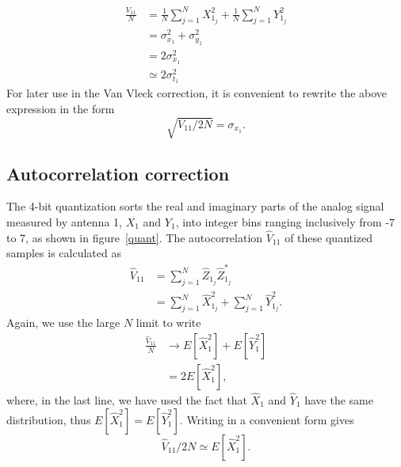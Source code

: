 \documentclass[11pt]{article}
\begin{document}
\begin{align}
\frac{V_{11}}{N}&=\frac{1}{N}\sum_{j=1}^N X_{1_j}^2+\frac{1}{N}\sum_{j=1}^N Y_{1_j}^2\\
&=\sigma_{x_1}^2 + \sigma_{y_1}^2\\
&= 2\sigma_{x_1}^2\\
&\simeq 2\sigma_{t_1}^2
\end{align}
For later use in the Van Vleck correction, it is convenient to rewrite the above expression in the form
\begin{equation}\label{auto}
\sqrt{V_{11}/2N}=\sigma_{x_1}.
\end{equation}

\subsection{Autocorrelation correction}\label{autos2}
The 4-bit quantization sorts the real and imaginary parts of the analog signal measured by antenna 1, $X_1$ and $Y_1$, into integer bins ranging inclusively from -7 to 7, as shown in figure~\ref{quant}. The autocorrelation $\hat V_{11}$ of these quantized samples is calculated as
\begin{align}
\hat V_{11} &= \sum_{j=1}^N \hat Z_{1_j} \hat Z_{1_j}^*\\
&= \sum_{j=1}^N \hat X_{1_j}^2 + \sum_{j=1}^N \hat Y_{1_j}^2.
\end{align}
Again, we use the large $N$ limit to write
\begin{align}
\frac{\hat V_{11}}{N} &\rightarrow E[\hat X_1^2] + E[\hat Y_1^2]\\
&= 2 E[\hat X_1^2],
\end{align}
where, in the last line, we have used the fact that $\hat X_1$ and $\hat Y_1$ have the same distribution, thus $E[\hat X_1^2] = E[\hat Y_1^2]$. Writing in a convenient form gives 
\begin{equation}\label{autohat}
\hat V_{11}/2N\simeq E[\hat X_1^2].
\end{equation}
\end{document}
